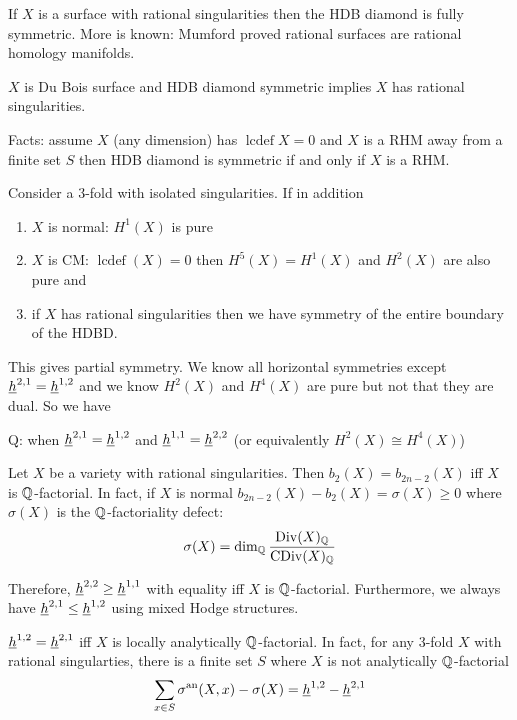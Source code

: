 \documentclass[12pt]{article}
\DeclareMathOperator{\lcdef}{\mathrm{lcdef}}
\begin{document}
\begin{example}
If $X$ is a surface with rational singularities then the HDB diamond is fully symmetric. More is known: Mumford proved rational surfaces are rational homology manifolds. 
\end{example}

\begin{exercise}
$X$ is Du Bois surface and HDB diamond symmetric implies $X$ has rational singularities.
\end{exercise}

Facts: assume $X$ (any dimension) has $\lcdef{X} = 0$ and $X$ is a RHM away from a finite set $S$ then HDB diamond is symmetric if and only if $X$ is a RHM. 


\begin{example}
Consider a $3$-fold with isolated singularities. If in addition
\begin{enumerate}
\item $X$ is normal: $H^1(X)$ is pure
\item $X$ is CM: $\lcdef(X) = 0$ then $H^5(X) = H^1(X)$ and $H^2(X)$ are also pure and 
\item if $X$ has rational singularities then we have symmetry of the entire boundary of the HDBD. 
\end{enumerate}
This gives partial symmetry. We know all horizontal symmetries except $\underline{h}^{2,1} = \underline{h}^{1,2}$ and we know $H^2(X)$ and $H^4(X)$ are pure but not that they are dual. So we have
\begin{center}
Q: when $\underline{h}^{2,1} = \underline{h}^{1,2}$ and $\underline{h}^{1,1} = \underline{h}^{2,2}$ (or equivalently $H^2(X) \cong H^4(X)$)
\end{center}
\end{example}

\begin{theorem}
Let $X$ be a variety with rational singularities. Then $b_2(X) = b_{2n-2}(X)$ iff $X$ is $\mathbb{Q}$-factorial. In fact, if $X$ is normal $b_{2n-2}(X) - b_2(X) = \sigma(X) \ge 0$ where $\sigma(X)$ is the $\mathbb{Q}$-factoriality defect:
\[ \sigma(X) = \dim_{\mathbb{Q}} \frac{\mathrm{Div}(X)_{\mathbb{Q}}}{\mathrm{CDiv}(X)_{\mathbb{Q}}} \]
\end{theorem}

Therefore, $\underline{h}^{2,2} \ge \underline{h}^{1,1}$ with equality iff $X$ is $\mathbb{Q}$-factorial. Furthermore, we always have $\underline{h}^{2,1} \le \underline{h}^{1,2}$ using mixed Hodge structures. 

\begin{theorem}
$\underline{h}^{1,2} = \underline{h}^{2,1}$ iff $X$ is locally analytically $\mathbb{Q}$-factorial. In fact, for any 3-fold $X$ with rational singularties, there is a finite set $S$ where $X$ is not analytically $\mathbb{Q}$-factorial 
\[ \sum_{x \in S} \sigma^{\mathrm{an}}(X, x) - \sigma(X) = \underline{h}^{1,2} - \underline{h}^{2,1} \]
\end{theorem}
\end{document}

